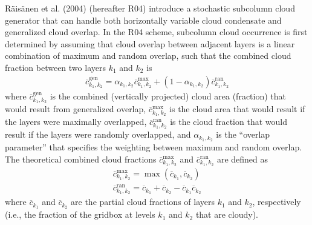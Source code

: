 Räisänen et al. (2004) (hereafter R04) introduce a stochastic subcolumn
cloud generator that can handle both horizontally variable cloud
condensate and generalized cloud overlap. In the R04 scheme, subcolumn
cloud occurrence is first determined by assuming that cloud overlap
between adjacent layers is a linear combination of maximum and random
overlap, such that the combined cloud fraction between two layers
\(k_1\) and \(k_2\) is \[\begin{gathered}
\overline{c}_{k_1, k_2}^\textrm{gen} = \alpha_{k_1, k_2} \overline{c}_{k_1, k_2}^\textrm{max} + (1 - \alpha_{k_1, k_2})
\overline{c}_{k_1, k_2}^\textrm{ran}
    \label{generalized_overlap_equation}\end{gathered}\] where
\(\overline{c}_{k_1, k_2}^\textrm{gen}\) is the combined (vertically
projected) cloud area (fraction) that would result from generalized
overlap, \(\overline{c}_{k_1, k_2}^\textrm{max}\) is the cloud area that
would result if the layers were maximally overlapped,
\(\overline{c}_{k_1, k_2}^\textrm{ran}\) is the cloud fraction that
would result if the layers were randomly overlapped, and
\(\alpha_{k_1, k_2}\) is the ``overlap parameter'' that specifies the
weighting between maximum and random overlap. The theoretical combined
cloud fractions \(\overline{c}^\textrm{max}_{k_1, k_2}\) and
\(\overline{c}^\textrm{ran}_{k_1, k_2}\) are defined as
\[\begin{gathered}
    \overline{c}^\textrm{max}_{k_1, k_2} = \max(\overline{c}_{k_1},\overline{ c}_{k_2}) \\
    \overline{c}^\textrm{ran}_{k_1, k_2} = \overline{c}_{k_1} + \overline{c}_{k_2} - \overline{c}_{k_1} \overline{c}_{k_2}\end{gathered}\]
where \(\overline{c}_{k_1}\) and \(\overline{c}_{k_2}\) are the partial
cloud fractions of layers \(k_1\) and \(k_2\), respectively (i.e., the
fraction of the gridbox at levels \(k_1\) and \(k_2\) that are cloudy).

